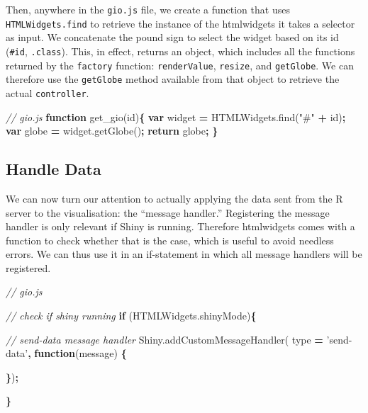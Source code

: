 \documentclass[10pt,]{krantz}
\makeatletter
\newenvironment{Shaded}{\begin{snugshade}}{\end{snugshade}}
\newcommand{\AttributeTok}[1]{\textcolor[rgb]{0.61,0.61,0.61}{#1}}
\newcommand{\CommentTok}[1]{\textcolor[rgb]{0.37,0.37,0.37}{\textit{#1}}}
\newcommand{\ControlFlowTok}[1]{\textcolor[rgb]{0.27,0.27,0.27}{\textbf{#1}}}
\newcommand{\KeywordTok}[1]{\textcolor[rgb]{0.27,0.27,0.27}{\textbf{#1}}}
\newcommand{\NormalTok}[1]{#1}
\newcommand{\OperatorTok}[1]{\textcolor[rgb]{0.43,0.43,0.43}{\textbf{#1}}}
\newcommand{\StringTok}[1]{\textcolor[rgb]{0.5,0.5,0.5}{#1}}
\newcommand{\VariableTok}[1]{\textcolor[rgb]{0,0,0}{#1}}
\newenvironment{kframe}{%
\medskip{}
\setlength{\fboxsep}{.8em}
 \def\at@end@of@kframe{}%
 \ifinner\ifhmode%
  \def\at@end@of@kframe{\end{minipage}}%
  \begin{minipage}{\columnwidth}%
 \fi\fi%
 \def\FrameCommand##1{\hskip\@totalleftmargin \hskip-\fboxsep
 \colorbox{shadecolor}{##1}\hskip-\fboxsep
     \hskip-\linewidth \hskip-\@totalleftmargin \hskip\columnwidth}%
 \MakeFramed {\advance\hsize-\width
   \@totalleftmargin\z@ \linewidth\hsize
   \@setminipage}}%
 {\par\unskip\endMakeFramed%
 \at@end@of@kframe}
\renewenvironment{Shaded}{\begin{kframe}}{\end{kframe}}
\makeatother
\begin{document}
Then, anywhere in the \texttt{gio.js} file, we create a function that uses \texttt{HTMLWidgets.find} to retrieve the instance of the htmlwidgets it takes a selector as input. We concatenate the pound sign to select the widget based on its id (\texttt{\#id}, \texttt{.class}). This, in effect, returns an object, which includes all the functions returned by the \texttt{factory} function: \texttt{renderValue}, \texttt{resize}, and \texttt{getGlobe}. We can therefore use the \texttt{getGlobe} method available from that object to retrieve the actual \texttt{controller}.

\begin{Shaded}
\begin{Highlighting}[]
\CommentTok{// gio.js}
\KeywordTok{function} \AttributeTok{get_gio}\NormalTok{(id)}\OperatorTok{\{}
  \KeywordTok{var}\NormalTok{ widget }\OperatorTok{=} \VariableTok{HTMLWidgets}\NormalTok{.}\AttributeTok{find}\NormalTok{(}\StringTok{"#"} \OperatorTok{+}\NormalTok{ id)}\OperatorTok{;}
  \KeywordTok{var}\NormalTok{ globe }\OperatorTok{=} \VariableTok{widget}\NormalTok{.}\AttributeTok{getGlobe}\NormalTok{()}\OperatorTok{;}
  \ControlFlowTok{return}\NormalTok{ globe}\OperatorTok{;}
\OperatorTok{\}}
\end{Highlighting}
\end{Shaded}

\hypertarget{shiny-widgets-handle-data}{%
\subsection{Handle Data}\label{shiny-widgets-handle-data}}

We can now turn our attention to actually applying the data sent from the R server to the visualisation: the ``message handler.'' Registering the message handler is only relevant if Shiny is running. Therefore htmlwidgets comes with a function to check whether that is the case, which is useful to avoid needless errors. We can thus use it in an if-statement in which all message handlers will be registered.

\begin{Shaded}
\begin{Highlighting}[]
\CommentTok{// gio.js}

\CommentTok{// check if shiny running}
\ControlFlowTok{if}\NormalTok{ (}\VariableTok{HTMLWidgets}\NormalTok{.}\AttributeTok{shinyMode}\NormalTok{)}\OperatorTok{\{}

  \CommentTok{// send-data message handler}
  \VariableTok{Shiny}\NormalTok{.}\AttributeTok{addCustomMessageHandler}\NormalTok{(}
\NormalTok{    type }\OperatorTok{=} \StringTok{'send-data'}\OperatorTok{,} \KeywordTok{function}\NormalTok{(message) }\OperatorTok{\{}

  \OperatorTok{\}}\NormalTok{)}\OperatorTok{;}

\OperatorTok{\}}
\end{Highlighting}
\end{Shaded}
\end{document}
